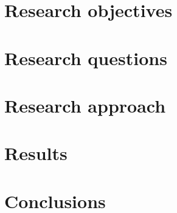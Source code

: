 \section{Research objectives}

\section{Research questions}

\section{Research approach}

\section{Results}

\section{Conclusions}

